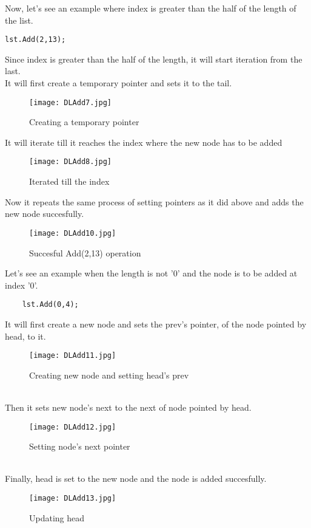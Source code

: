 \documentclass[11pt,fleqn]{book} %
\begin{document}
\begin{example}
Now, let's see an example where index is greater than the half of the length of the list.\\
\begin{lstlisting}
lst.Add(2,13);
\end{lstlisting}
Since index is greater than the half of the length, it will start iteration from the last.\\
It will first create a temporary pointer and sets it to the tail.
\begin{figure}[H]
	\centering
	\texttt{[image: DLAdd7.jpg]}
	\caption{Creating a temporary pointer}
\end{figure}
It will iterate till it reaches the index where the new node has to be added
\begin{figure}[H]
	\centering
	\texttt{[image: DLAdd8.jpg]}
	\caption{Iterated till the index}
\end{figure}
Now it repeats the same process of setting pointers as it did above and adds the new node succesfully.
\begin{figure}[H]
	\centering
	\texttt{[image: DLAdd10.jpg]}
	\caption{Succesful Add(2,13) operation}
\end{figure}
\end{example}
Let's see an example when the length is not '0' and the node is to be added at index '0'.
\begin{example}
	\begin{lstlisting}
	lst.Add(0,4);
	\end{lstlisting}
It will first create a new node and sets the prev's pointer, of the node pointed by head, to it.
\begin{figure}[H]
	\centering
	\texttt{[image: DLAdd11.jpg]}
	\caption{Creating new node and setting head's prev}
\end{figure}~\\
Then it sets new node's next to the next of node pointed by head.
\begin{figure}[H]
	\centering
	\texttt{[image: DLAdd12.jpg]}
	\caption{Setting node's next pointer}
\end{figure}~\\
Finally, head is set to the new node and the node is added succesfully.
\begin{figure}[H]
	\centering
	\texttt{[image: DLAdd13.jpg]}
	\caption{Updating head}
\end{figure}
\end{example}
\end{document}
